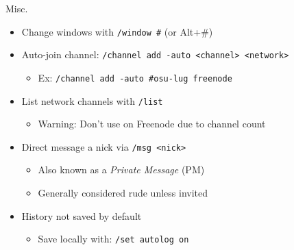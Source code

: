 \documentclass{beamer}
\begin{document}
\begin{frame}{Misc.}
\begin{itemize}
	\item Change windows with \texttt{/window \#} (or Alt+\#)
	\item Auto-join channel: \texttt{/channel add -auto <channel> <network>}
	\begin{itemize}
		\item Ex: \texttt{/channel add -auto \#osu-lug freenode}
	\end{itemize}
	\item List network channels with \texttt{/list}
	\begin{itemize}
		\item Warning: Don't use on Freenode due to channel count
	\end{itemize}
	\item Direct message a nick via \texttt{/msg <nick>}
	\begin{itemize}
		\item Also known as a \emph{Private Message} (PM)
		\item Generally considered rude unless invited
	\end{itemize}
	\item History not saved by default
	\begin{itemize}
		\item Save locally with: \texttt{/set autolog on}
	\end{itemize}
\end{itemize}
\end{frame}
\end{document}
